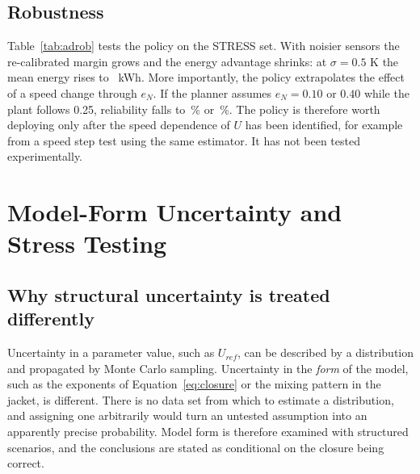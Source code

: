 \documentclass[11pt,letterpaper]{article}
\begin{document}
\subsection{Robustness}
Table~\ref{tab:adrob} tests the policy on the STRESS set. With noisier sensors the re-calibrated margin grows and the energy advantage shrinks: at \(\sigma = 0.5\) K the mean energy rises to \vRobHalfE\ kWh. More importantly, the policy extrapolates the effect of a speed change through \(e_N\). If the planner assumes \(e_N = 0.10\) or \(0.40\) while the plant follows 0.25, reliability falls to \vRobLowEN\,\% or \vRobHighEN\,\%. The policy is therefore worth deploying only after the speed dependence of \(U\) has been identified, for example from a speed step test using the same estimator. It has not been tested experimentally.

\begin{table}[H]
\centering
\caption{Adaptive-policy robustness (STRESS set; \(\delta\) re-calibrated on CAL for each sensor-noise level and rounded up to 0.05 K).}\label{tab:adrob}
{\small}
\end{table}

\section{Model-Form Uncertainty and Stress Testing}\label{sec:modelform}

\subsection{Why structural uncertainty is treated differently}
Uncertainty in a parameter value, such as \(U_{ref}\), can be described by a distribution and propagated by Monte Carlo sampling. Uncertainty in the \emph{form} of the model, such as the exponents of Equation~\ref{eq:closure} or the mixing pattern in the jacket, is different. There is no data set from which to estimate a distribution, and assigning one arbitrarily would turn an untested assumption into an apparently precise probability. Model form is therefore examined with structured scenarios, and the conclusions are stated as conditional on the closure being correct.
\end{document}
